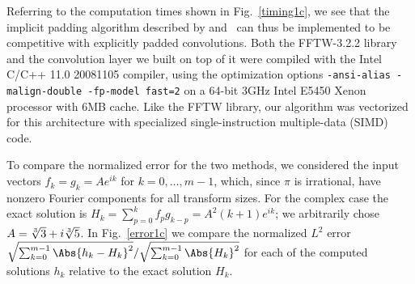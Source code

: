 \documentclass[final]{siamltex}
\begin{document}
Referring to the computation times shown in Fig.~\ref{timing1c},
we see that the implicit padding algorithm described by  
and~
can thus be implemented to be competitive with explicitly padded
convolutions. Both the FFTW-3.2.2 library and the convolution layer we built on
top of it were compiled with the Intel C/C++ 11.0 20081105 compiler, using
the optimization options {\tt -ansi-alias -malign-double -fp-model fast=2}
on a 64-bit 3GHz Intel E5450 Xenon processor with 6MB cache. Like the FFTW
library, our algorithm was vectorized for this architecture with
specialized single-instruction multiple-data (SIMD) code.

To compare the normalized error for the two methods, we considered the
input vectors $f_k=g_k=A e^{ik}$ for $k=0,\ldots,m-1$, which, since $\pi$ is
irrational, have nonzero Fourier components for all transform sizes.
For the complex case the exact solution is $H_k=\sum_{p=0}^k f_p
g_{k-p}=A^2 (k+1) e^{ik}$; we arbitrarily chose $A=\root3\of3+ i\root3\of 5$.
In Fig.~\ref{error1c} we compare the normalized $L^2$ error 
$\sqrt{\sum_{k=0}^{m-1}\Abs{h_k-H_k}^2}/\sqrt{\sum_{k=0}^{m-1} \Abs{H_k}^2}$
for each of the computed solutions $h_k$ relative to the exact solution $H_k$.

\setlength{\algomargin}{0.6em}
\SetAlCapSkip{3pt}
\def\fft{{\tt fft}}
\def\crfft{{\tt crfft}}
\def\rcfft{{\tt rcfft}}
\def\fftOpadBackwards{{\tt fft0padBackwards}}
\def\fftOpadForwards{{\tt fft0padForwards}}
\def\fftObipadBackwards{{\tt fft0bipadBackwards}}
\def\fftObipadForwards{{\tt fft0bipadForwards}}
\end{document}
